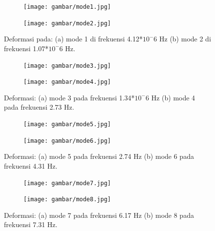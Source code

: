 \begin{figure}[H]
	\begin{subfigure}{0.49\textwidth}
		\centering
		\texttt{[image: gambar/mode1.jpg]}
		\caption{}
		\label{fig:mode1}
	\end{subfigure}
	\centering
	\begin{subfigure}{0.49\textwidth}
		\centering
		\texttt{[image: gambar/mode2.jpg]}
		\caption{}
		\label{fig:mode2}
	\end{subfigure}
	\caption{Deformasi pada: (a) mode 1 di frekuensi 4.12*$10^-6$ Hz (b) mode 2 di frekuensi 1.07*$10^-6$ Hz.}
\end{figure}

\begin{figure}[H]
	\begin{subfigure}{0.49\textwidth}
		\centering
		\texttt{[image: gambar/mode3.jpg]}
		\caption{}
		\label{fig:mode3}
	\end{subfigure}
	\centering
	\begin{subfigure}{0.49\textwidth}
		\centering
		\texttt{[image: gambar/mode4.jpg]}
		\caption{}
		\label{fig:mode4}
	\end{subfigure}
	\caption{Deformasi: (a) mode 3 pada frekuensi 1.34*$10^-6$ Hz (b) mode 4 pada frekuensi 2.73 Hz.}
\end{figure}

\begin{figure}[H]
	\begin{subfigure}{0.49\textwidth}
		\centering
		\texttt{[image: gambar/mode5.jpg]}
		\caption{}
		\label{fig:mode5}
	\end{subfigure}
	\centering
	\begin{subfigure}{0.49\textwidth}
		\centering
		\texttt{[image: gambar/mode6.jpg]}
		\caption{}
		\label{fig:mode6}
	\end{subfigure}
	\caption{Deformasi: (a) mode 5 pada frekuensi 2.74 Hz (b) mode 6 pada frekuensi 4.31 Hz.}
\end{figure}

\begin{figure}[H]
	\begin{subfigure}{0.49\textwidth}
		\centering
		\texttt{[image: gambar/mode7.jpg]}
		\caption{}
		\label{fig:mode7}
	\end{subfigure}
	\centering
	\begin{subfigure}{0.49\textwidth}
		\centering
		\texttt{[image: gambar/mode8.jpg]}
		\caption{}
		\label{fig:mode8}
	\end{subfigure}
	\caption{Deformasi: (a) mode 7 pada frekuensi 6.17 Hz (b) mode 8 pada frekuensi 7.31 Hz.}
\end{figure}

